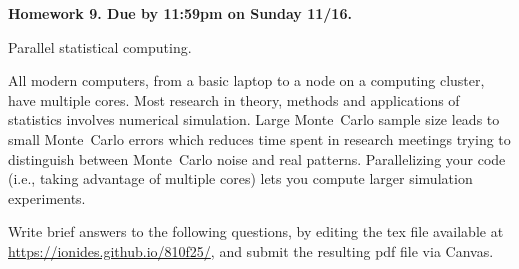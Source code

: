 \documentclass[12pt]{article}
\begin{document}
\begin{center}\bf
Homework 9. Due by 11:59pm on Sunday 11/16.

Parallel statistical computing.

\end{center}

All modern computers, from a basic laptop to a node on a computing cluster, have multiple cores.  Most research in theory, methods and applications of statistics involves numerical simulation. Large Monte~Carlo sample size leads to small Monte~Carlo errors which reduces time spent in research meetings trying to distinguish between Monte~Carlo noise and real patterns. Parallelizing your code (i.e., taking advantage of multiple cores) lets you compute larger simulation experiments.

Write brief answers to the following questions, by editing the tex file available at \url{https://ionides.github.io/810f25/}, and submit the resulting pdf file via Canvas. 
\end{document}
